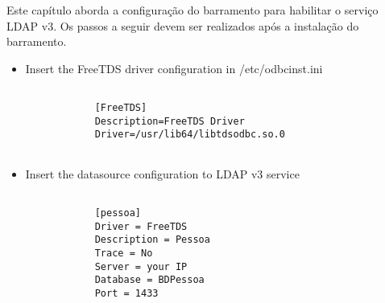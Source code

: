 Este capítulo aborda a configuração do barramento para habilitar o serviço LDAP v3. Os
passos a seguir devem ser realizados após a instalação do barramento.

\begin{itemize}


	\item  Insert the FreeTDS driver configuration in /etc/odbcinst.ini 

	
		\renewcommand{\lstlistingname}{Código}             
		\begin{lstlisting}[Adding Erlang repository entry, label=freetds_config] 

			[FreeTDS]
			Description=FreeTDS Driver
			Driver=/usr/lib64/libtdsodbc.so.0
			
		\end{lstlisting}	

	
	\item  Insert the datasource configuration to LDAP v3 service
	
		\renewcommand{\lstlistingname}{Código}             
		\begin{lstlisting}[Adding Erlang repository entry, label=datasource_config] 

			[pessoa]
			Driver = FreeTDS
			Description = Pessoa
			Trace = No
			Server = your IP
			Database = BDPessoa
			Port = 1433			

		\end{lstlisting}	
	
	
\end{itemize}

